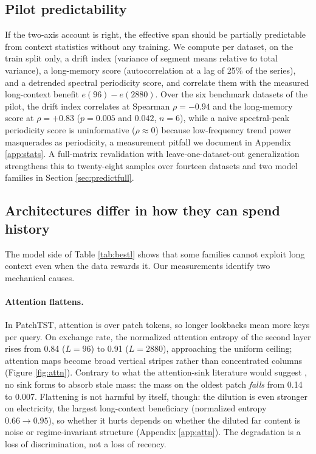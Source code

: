 \subsection{Pilot predictability}
\label{sec:predict}
If the two-axis account is right, the effective span should be partially predictable from context statistics without any training. We compute per dataset, on the train split only, a drift index (variance of segment means relative to total variance), a long-memory score (autocorrelation at a lag of 25\% of the series), and a detrended spectral periodicity score, and correlate them with the measured long-context benefit $e(96) - e(2880)$. Over the six benchmark datasets of the pilot, the drift index correlates at Spearman $\rho = -0.94$ and the long-memory score at $\rho = +0.83$ ($p = 0.005$ and $0.042$, $n = 6$), while a naive spectral-peak periodicity score is uninformative ($\rho \approx 0$) because low-frequency trend power masquerades as periodicity, a measurement pitfall we document in Appendix \ref{app:stats}. A full-matrix revalidation with leave-one-dataset-out generalization strengthens this to twenty-eight samples over fourteen datasets and two model families in Section \ref{sec:predictfull}.

\subsection{Architectures differ in how they can spend history}
\label{sec:mechanism}

The model side of Table \ref{tab:bestl} shows that some families cannot exploit long context even when the data rewards it. Our measurements identify two mechanical causes.

\paragraph{Attention flattens.}
In PatchTST, attention is over patch tokens, so longer lookbacks mean more keys per query. On exchange rate, the normalized attention entropy of the second layer rises from 0.84 ($L{=}96$) to 0.91 ($L{=}2880$), approaching the uniform ceiling; attention maps become broad vertical stripes rather than concentrated columns (Figure \ref{fig:attn}). Contrary to what the attention-sink literature would suggest \citep{streamingllm}, no sink forms to absorb stale mass: the mass on the oldest patch \emph{falls} from 0.14 to 0.007. Flattening is not harmful by itself, though: the dilution is even stronger on electricity, the largest long-context beneficiary (normalized entropy $0.66 \to 0.95$), so whether it hurts depends on whether the diluted far content is noise or regime-invariant structure (Appendix \ref{app:attn}). The degradation is a loss of discrimination, not a loss of recency.

